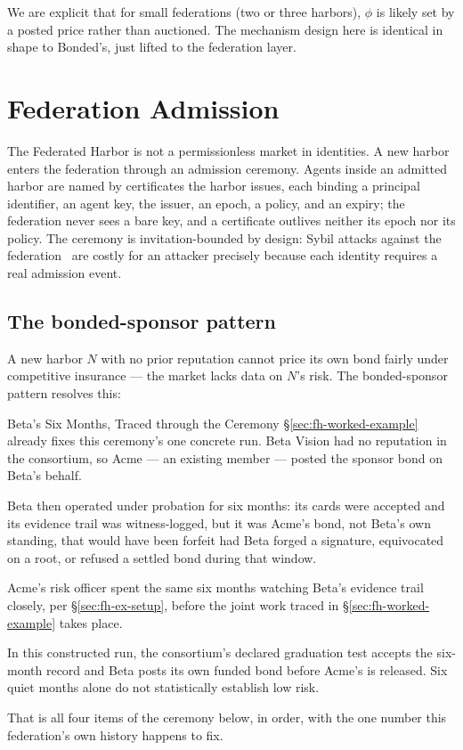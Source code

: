 \documentclass[11pt,a4paper]{article}
\theoremstyle{definition}
\theoremstyle{remark}
\begin{document}
We are explicit that for small federations (two or three harbors), $\phi$ is likely set by a posted price rather than auctioned. The mechanism design here is identical in shape to Bonded's, just lifted to the federation layer.

\section{Federation Admission}\label{sec:fh-admission}
\ifpdmargincolumn\pdlifetimeintersection\fi

The Federated Harbor is not a permissionless market in identities. A new harbor enters the federation through an admission ceremony. Agents inside an admitted harbor are named by certificates the harbor issues, each binding a principal identifier, an agent key, the issuer, an epoch, a policy, and an expiry; the federation never sees a bare key, and a certificate outlives neither its epoch nor its policy. The ceremony is invitation-bounded by design: Sybil attacks against the federation~ are costly for an attacker precisely because each identity requires a real admission event.

\subsection{The bonded-sponsor pattern}\label{sec:fh-sponsor}

A new harbor $N$ with no prior reputation cannot price its own bond fairly under competitive insurance --- the market lacks data on $N$'s risk. The bonded-sponsor pattern resolves this:

\begin{pdexample}{Beta's Six Months, Traced through the Ceremony}
\setlength{\parskip}{4pt plus 1pt}
\S\ref{sec:fh-worked-example} already fixes this ceremony's one concrete run. Beta Vision had no reputation in the consortium, so Acme --- an existing member --- posted the sponsor bond on Beta's behalf.

Beta then operated under probation for six months: its cards were accepted and its evidence trail was witness-logged, but it was Acme's bond, not Beta's own standing, that would have been forfeit had Beta forged a signature, equivocated on a root, or refused a settled bond during that window.

Acme's risk officer spent the same six months watching Beta's evidence trail closely, per \S\ref{sec:fh-ex-setup}, before the joint work traced in \S\ref{sec:fh-worked-example} takes place.

In this constructed run, the consortium's declared graduation test accepts
the six-month record and Beta posts its own funded bond before Acme's is
released. Six quiet months alone do not statistically establish low risk.

That is all four items of the ceremony below, in order, with the one number this federation's own history happens to fix.
\end{pdexample}
\end{document}
